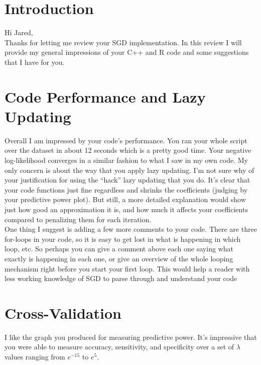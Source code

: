 \documentclass[11pt]{article}
\begin{document}
\maketitle

\setlength{\parindent}{0cm}

\section{Introduction}
Hi Jared, \\

Thanks for letting me review your SGD implementation. In this review I will provide my general impressions of your \textsf{C++} and \textsf{R} code and some suggestions that I have for you. 

\section{Code Performance and Lazy Updating}

Overall I am impressed by your code's performance. You ran your whole script over the dataset in about 12 seconds which is a pretty good time. Your negative log-likelihood converges in a similar fashion to what I saw in my own code. My only concern is about the way that you apply lazy updating. I'm not sure why of your justification for using the ``hack'' lazy updating that you do. It's clear that your code functions just fine regardless and shrinks the coefficients (judging by your predictive power plot). But still, a more detailed explanation would show just how good an approximation it is, and how much it affects your coefficients compared to penalizing them for each iteration. \\

One thing I suggest is adding a few more comments to your code. There are three for-loops in your code, so it is easy to get lost in what is happening in which loop, etc. So perhaps you can give a comment above each one saying what exactly is happening in each one, or give an overview of the whole looping mechanism right before you start your first loop. This would help a reader with less working knowledge of SGD to parse through and understand your code 


\section{Cross-Validation}

I like the graph you produced for measuring predictive power. It's impressive that you were able to measure accuracy, sensitivity, and specificity over a set of $\lambda$ values ranging from $e^{-15}$ to $e^{5}$. \\
\end{document}
